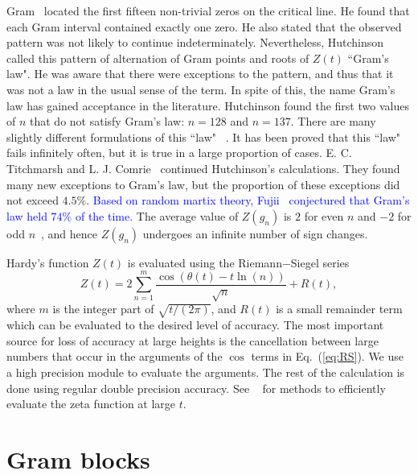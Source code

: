 \documentclass[twoside]{article}
\theoremstyle{definition}
\begin{document}
Gram~\cite{Gram 1903} located the first fifteen non-trivial zeros on the critical line. He found that each Gram interval 
contained exactly one zero. He also stated that the observed pattern was not likely to continue indeterminately. 
Nevertheless, Hutchinson~\cite{Hutchinson 1925} called this pattern of alternation of Gram points and roots of $Z(t)$ ``Gram's law". He was aware that there were exceptions to the pattern, and thus that it was not a law in the usual sense of the term. In spite of this, the name Gram's law has gained acceptance in the literature. Hutchinson found the first two values of $n$ that do not satisfy Gram's
law: $n = 128$ and $n = 137$.
There are many slightly different  formulations of this ``law" ~\cite{Korolev,Trudgian}.
It has been proved that this ``law" fails infinitely often, but it is true in a large proportion of cases. E. C. Titchmarsh and L. J. Comrie~\cite{Titchmarsh 1935,Titchmarsh 1936} continued Hutchinson's calculations. They found many new exceptions
to Gram's law, but the proportion of these exceptions did not exceed $4.5\%$. \textcolor{blue}{Based on random martix theory, Fujii~\cite{Fujii} conjectured that Gram's law held $74\%$ of the time.}
The average value of $Z(g_n)$ is $2$ for even $n$ and $-2$ for odd $n$~\cite{Titchmarsh 1986},
and hence $Z(g_n)$ undergoes an infinite number of sign changes.

Hardy's function $Z(t)$  is evaluated using the Riemann$-$Siegel series
\begin{equation}
Z(t) = 2\sum^{m}_{n=1}\frac{\cos(\theta(t) - t \ln (n))}{\sqrt{n}} + R(t), 
\label{eq:RS}
\end{equation}
where $m$ is the integer part of $\sqrt{t/(2\pi)}$, and $R(t)$ is a small remainder
term which can be evaluated to the desired level of accuracy. The most important 
source for loss of accuracy at large heights is the cancellation between
large numbers that occur in the arguments of the $\cos$ terms in Eq.~(\ref{eq:RS}). We 
use a high precision module to evaluate the arguments. The rest of the calculation
is done using regular double precision accuracy. See ~\cite{Odlyzko 1992,hiary,gourdon} for methods to efficiently evaluate the zeta function at large $t$.

\section{\label{sec4}Gram blocks}
\end{document}
